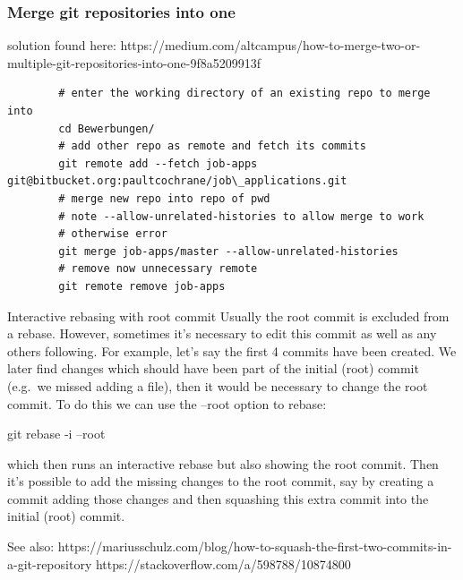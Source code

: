 \documentclass{git_course}
\begin{document}


\begin{frame}[fragile]
    \frametitle{Merge git repositories into one}

solution found here: https://medium.com/altcampus/how-to-merge-two-or-multiple-git-repositories-into-one-9f8a5209913f
    \begin{verbatim}
        # enter the working directory of an existing repo to merge into
        cd Bewerbungen/
        # add other repo as remote and fetch its commits
        git remote add --fetch job-apps git@bitbucket.org:paultcochrane/job\_applications.git
        # merge new repo into repo of pwd
        # note --allow-unrelated-histories to allow merge to work
        # otherwise error
        git merge job-apps/master --allow-unrelated-histories
        # remove now unnecessary remote
        git remote remove job-apps
    \end{verbatim}

\end{frame}

\begin{frame}{Interactive rebasing with root commit}
    Usually the root commit is excluded from a rebase.  However, sometimes
    it's necessary to edit this commit as well as any others following.  For
    example, let's say the first 4 commits have been created.  We later find
    changes which should have been part of the initial (root) commit (e.g.\ we
    missed adding a file), then it would be necessary to change the root
    commit.  To do this we can use the --root option to rebase:

    git rebase -i --root

    which then runs an interactive rebase but also showing the root commit.
    Then it's possible to add the missing changes to the root commit, say by
    creating a commit adding those changes and then squashing this extra
    commit into the initial (root) commit.

    See also:
    https://mariusschulz.com/blog/how-to-squash-the-first-two-commits-in-a-git-repository
    https://stackoverflow.com/a/598788/10874800
\end{frame}
\end{document}

